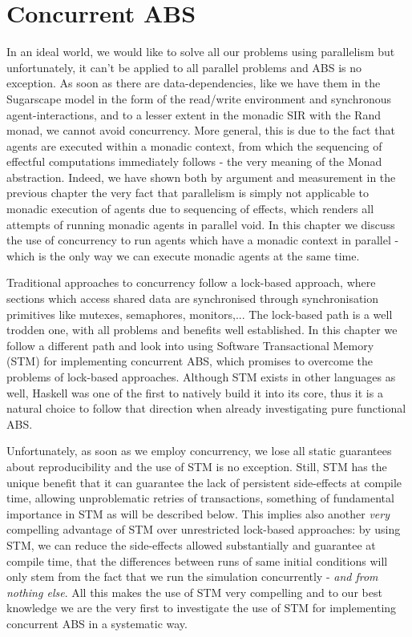 \chapter{Concurrent ABS}
In an ideal world, we would like to solve all our problems using parallelism but unfortunately, it can't be applied to all parallel problems and ABS is no exception. As soon as there are data-dependencies, like we have them in the Sugarscape model in the form of the read/write environment and synchronous agent-interactions, and to a lesser extent in the monadic SIR with the Rand monad, we cannot avoid concurrency. More general, this is due to the fact that agents are executed within a monadic context, from which the  sequencing of effectful computations immediately follows - the very meaning of the Monad abstraction. Indeed, we have shown both by argument and measurement in the previous chapter the very fact that parallelism is simply not applicable to monadic execution of agents due to sequencing of effects, which renders all attempts of running monadic agents in parallel void. In this chapter we discuss the use of concurrency to run agents which have a monadic context in parallel - which is the only way we can execute monadic agents at the same time.

\medskip

Traditional approaches to concurrency follow a lock-based approach, where sections which access shared data are synchronised through synchronisation primitives like mutexes, semaphores, monitors,... The lock-based path is a well trodden one, with all problems and benefits well established. In this chapter we follow a different path and look into using Software Transactional Memory (STM) for implementing concurrent ABS, which promises to overcome the problems of lock-based approaches. Although STM exists in other languages as well, Haskell was one of the first to natively build it into its core, thus it is a natural choice to follow that direction when already investigating pure functional ABS.

Unfortunately, as soon as we employ concurrency, we lose all static guarantees about reproducibility and the use of STM is no exception. Still, STM has the unique benefit that it can guarantee the lack of persistent side-effects at compile time, allowing unproblematic retries of transactions, something of fundamental importance in STM as will be described below. This implies also another \textit{very} compelling advantage of STM over unrestricted lock-based approaches: by using STM, we can reduce the side-effects allowed substantially and guarantee at compile time, that the differences between runs of same initial conditions will only stem from the fact that we run the simulation concurrently - \textit{and from nothing else}. All this makes the use of STM very compelling and to our best knowledge we are the very first to investigate the use of STM for implementing concurrent ABS in a systematic way.

